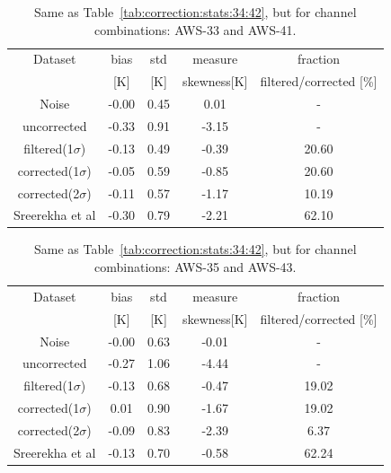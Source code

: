 \documentclass[12pt]{article}
\begin{document}
\begin{table}[!bt]
	\centering
	\begin{tabular}[b]{c|c|c|c|c}
		Dataset  		  &   bias &   std &   measure  & fraction\\
		&   [K]  &   [K] & skewness[K]                   & filtered/corrected [\%]\\
		\hline
	Noise             &  -0.00 &  0.45 &               0.01 &               - \\
	uncorrected       &  -0.33 &  0.91 &              -3.15 &                - \\
	filtered(1$\sigma$)  &  -0.13 &  0.49 &              -0.39 &               20.60 \\
	corrected(1$\sigma$) &  -0.05 &  0.59 &              -0.85 &               20.60 \\
	corrected(2$\sigma$) &  -0.11 &  0.57 &              -1.17 &               10.19 \\
	Sreerekha et al   &  -0.30 &  0.79 &              -2.21 &               62.10 \\
		\hline
	\end{tabular}
	\caption{Same as Table~\ref{tab:correction:stats:34:42}, but for channel combinations: AWS-33 and AWS-41.   }
	\label{tab:correction:stats:33:41}
\end{table}

\begin{table}[!bt]
	\centering
	\begin{tabular}[b]{c|c|c|c|c}
		Dataset  		  &   bias &   std &   measure & fraction \\
		&   [K]  &   [K] & skewness[K] & filtered/corrected [\%]\\
		\hline
 Noise             &  -0.00 &  0.63 &              -0.01 &                - \\
uncorrected       &  -0.27 &  1.06 &              -4.44 &                - \\
filtered(1$\sigma$)  &  -0.13 &  0.68 &              -0.47 &               19.02 \\
corrected(1$\sigma$) &   0.01 &  0.90 &              -1.67 &               19.02 \\
corrected(2$\sigma$) &  -0.09 &  0.83 &              -2.39 &                6.37 \\
Sreerekha et al   &  -0.13 &  0.70 &              -0.58 &               62.24 \\
		\hline
	\end{tabular}
	\caption{Same as Table~\ref{tab:correction:stats:34:42}, but for channel combinations: AWS-35 and AWS-43.   }
	\label{tab:correction:stats:35:43}
\end{table}
\end{document}

